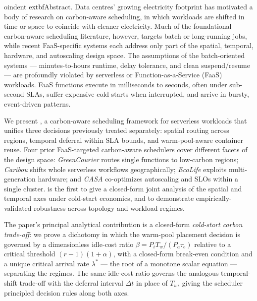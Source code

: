 
oindent	extbf{Abstract.}
Data centres' growing electricity footprint has motivated a body of
research on carbon-aware scheduling, in which workloads are shifted in
time or space to coincide with cleaner electricity. Much of the
foundational carbon-aware scheduling literature, however, targets
batch or long-running jobs, while recent FaaS-specific systems each
address only part of the spatial, temporal, hardware, and autoscaling
design space. The assumptions of the batch-oriented systems
--- minutes-to-hours runtime, delay tolerance, and clean
suspend/resume --- are profoundly violated by serverless or
Function-as-a-Service (FaaS) workloads. FaaS functions execute in
milliseconds to seconds, often under sub-second SLAs, suffer
expensive cold starts when interrupted, and arrive in bursty,
event-driven patterns.

We present \GreenFaaS, a carbon-aware scheduling framework for
serverless workloads that unifies three decisions previously treated
separately: spatial routing across regions, temporal deferral within
SLA bounds, and warm-pool-aware container reuse. Four prior FaaS-targeted
carbon-aware schedulers cover different facets of the design space:
\emph{GreenCourier} \citep{chadha2023greencourier} routes single
functions to low-carbon regions; \emph{Caribou} \citep{gsteiger2024caribou}
shifts whole serverless workflows geographically; \emph{EcoLife}
\citep{jiang2024ecolife} exploits multi-generation hardware; and
\emph{CASA} \citep{qi2024casa} co-optimizes autoscaling and SLOs within
a single cluster. \GreenFaaS{} is the first to give a closed-form
joint analysis of the spatial and temporal axes under cold-start
economics, and to demonstrate empirically-validated robustness across topology and
workload regimes.

The paper's principal analytical contribution is a closed-form
\emph{cold-start carbon trade-off}: we prove a dichotomy in which the
warm-pool placement decision is governed by a dimensionless idle-cost
ratio $\beta = P_i T_w / (P_a \tau_e)$ relative to a critical
threshold $(r-1)(1+\alpha)$, with a closed-form break-even condition and a unique critical
arrival rate $\lambda^*$ --- the root of a monotone scalar equation
--- separating the regimes. The same idle-cost ratio governs
the analogous temporal-shift trade-off with the deferral interval
$\Delta t$ in place of $T_w$, giving the scheduler principled
decision rules along both axes.

